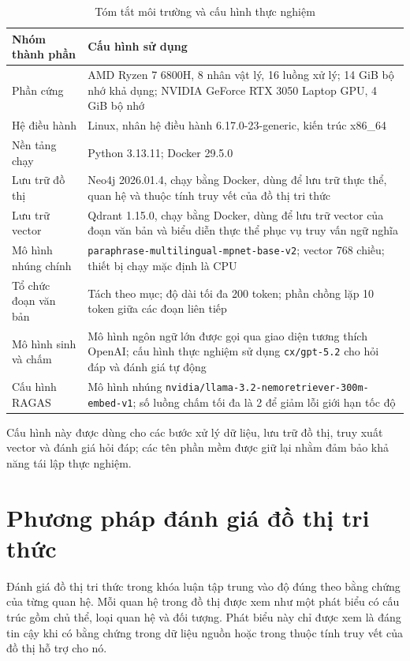 \begin{table}[h]
\centering
\caption{Tóm tắt môi trường và cấu hình thực nghiệm}
\label{tab:experiment_environment}
\begin{tabularx}{\textwidth}{|p{}|X|}
\hline
\textbf{Nhóm thành phần} & \textbf{Cấu hình sử dụng} \\
\hline
Phần cứng & AMD Ryzen 7 6800H, 8 nhân vật lý, 16 luồng xử lý; 14 GiB bộ nhớ khả dụng; NVIDIA GeForce RTX 3050 Laptop GPU, 4 GiB bộ nhớ \\
\hline
Hệ điều hành & Linux, nhân hệ điều hành 6.17.0-23-generic, kiến trúc x86\_64 \\
\hline
Nền tảng chạy & Python 3.13.11; Docker 29.5.0 \\
\hline
Lưu trữ đồ thị & Neo4j 2026.01.4, chạy bằng Docker, dùng để lưu trữ thực thể, quan hệ và thuộc tính truy vết của đồ thị tri thức \\
\hline
Lưu trữ vector & Qdrant 1.15.0, chạy bằng Docker, dùng để lưu trữ vector của đoạn văn bản và biểu diễn thực thể phục vụ truy vấn ngữ nghĩa \\
\hline
Mô hình nhúng chính & \texttt{paraphrase-multilingual-mpnet-base-v2}; vector 768 chiều; thiết bị chạy mặc định là CPU \\
\hline
Tổ chức đoạn văn bản & Tách theo mục; độ dài tối đa 200 token; phần chồng lặp 10 token giữa các đoạn liên tiếp \\
\hline
Mô hình sinh và chấm & Mô hình ngôn ngữ lớn được gọi qua giao diện tương thích OpenAI; cấu hình thực nghiệm sử dụng \texttt{cx/gpt-5.2} cho hỏi đáp và đánh giá tự động \\
\hline
Cấu hình RAGAS & Mô hình nhúng \texttt{nvidia/llama-3.2-nemoretriever-300m-embed-v1}; số luồng chấm tối đa là 2 để giảm lỗi giới hạn tốc độ \\
\hline
\end{tabularx}
\end{table}

Cấu hình này được dùng cho các bước xử lý dữ liệu, lưu trữ đồ thị, truy xuất vector và đánh giá hỏi đáp; các tên phần mềm được giữ lại nhằm đảm bảo khả năng tái lập thực nghiệm.



\section{Phương pháp đánh giá đồ thị tri thức}

Đánh giá đồ thị tri thức trong khóa luận tập trung vào độ đúng theo bằng chứng của từng quan hệ. Mỗi quan hệ trong đồ thị được xem như một phát biểu có cấu trúc gồm chủ thể, loại quan hệ và đối tượng. Phát biểu này chỉ được xem là đáng tin cậy khi có bằng chứng trong dữ liệu nguồn hoặc trong thuộc tính truy vết của đồ thị hỗ trợ cho nó.

